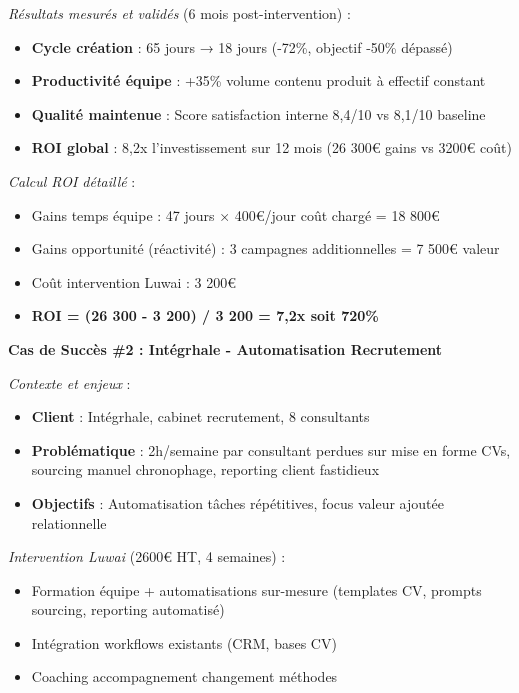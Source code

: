 \emph{Résultats mesurés et validés} (6 mois post-intervention) :
\begin{itemize}
    \item \textbf{Cycle création} : 65 jours → 18 jours (-72\%, objectif -50\% dépassé)
    \item \textbf{Productivité équipe} : +35\% volume contenu produit à effectif constant
    \item \textbf{Qualité maintenue} : Score satisfaction interne 8,4/10 vs 8,1/10 baseline
    \item \textbf{ROI global} : 8,2x l'investissement sur 12 mois (26 300€ gains vs 3200€ coût)
\end{itemize}

\emph{Calcul ROI détaillé} :
\begin{itemize}
    \item Gains temps équipe : 47 jours × 400€/jour coût chargé = 18 800€
    \item Gains opportunité (réactivité) : 3 campagnes additionnelles = 7 500€ valeur
    \item Coût intervention Luwai : 3 200€
    \item \textbf{ROI = (26 300 - 3 200) / 3 200 = 7,2x soit 720\%}
\end{itemize}

\textbf{Cas de Succès \#2 : Intégrhale - Automatisation Recrutement}

\emph{Contexte et enjeux} \cite{luwai2025integrhale} :
\begin{itemize}
    \item \textbf{Client} : Intégrhale, cabinet recrutement, 8 consultants
    \item \textbf{Problématique} : 2h/semaine par consultant perdues sur mise en forme CVs, sourcing manuel chronophage, reporting client fastidieux
    \item \textbf{Objectifs} : Automatisation tâches répétitives, focus valeur ajoutée relationnelle
\end{itemize}

\emph{Intervention Luwai} (2600€ HT, 4 semaines) :
\begin{itemize}
    \item Formation équipe + automatisations sur-mesure (templates CV, prompts sourcing, reporting automatisé)
    \item Intégration workflows existants (CRM, bases CV)
    \item Coaching accompagnement changement méthodes
\end{itemize}

